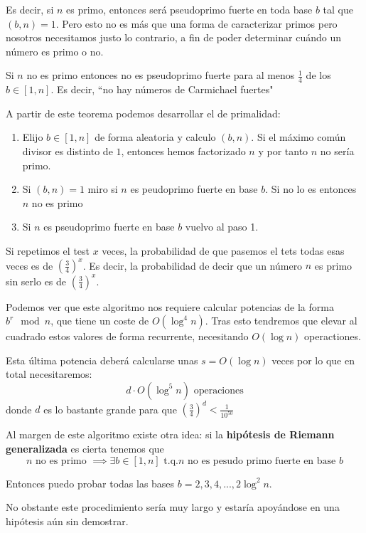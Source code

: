 Es decir, si $n$ es primo, entonces será pseudoprimo fuerte en toda base $b$ tal que $(b,n)=1$.
Pero esto no es más que una forma de caracterizar primos pero nosotros necesitamos justo lo contrario, a fin de poder determinar cuándo un número es primo o no.

\begin{theorem}
Si $n$ no es primo entonces no es pseudoprimo fuerte para al menos $\frac{1}{4}$ de los $b\in [1,n]$. Es decir, ``no hay números de Carmichael fuertes"
\end{theorem}

A partir de este teorema podemos desarrollar el  de primalidad:
\begin{enumerate}
\item Elijo $b\in[1,n]$ de forma aleatoria y calculo $(b,n)$. Si el máximo común divisor es distinto de $1$, entonces hemos factorizado $n$ y por tanto $n$ no sería primo.
\item Si $(b,n)=1$ miro si $n$ es peudoprimo fuerte en base $b$. Si no lo es entonces $n$ no es primo
\item Si $n$ es pseudoprimo fuerte en base $b$ vuelvo al paso 1.
\end{enumerate}

Si repetimos el test $x$ veces, la probabilidad de que pasemos el tets todas esas veces es de $\left(\frac{3}{4}\right)^x$. Es decir, la probabilidad de decir que un número $n$ es primo sin serlo es de $\left(\frac{3}{4}\right)^x$.

Podemos ver que este algoritmo nos requiere calcular potencias de la forma $b^r \mod n$, que tiene un coste de $O(\log^4n)$. Tras esto tendremos que elevar al cuadrado estos valores de forma recurrente, necesitando $O(\log n)$ operactiones.

Esta última potencia deberá calcularse unas $s=O(\log n)$ veces por lo que en total necesitaremos:
\[d\cdot O(\log^5 n)\text{ operaciones}\]
donde $d$ es lo bastante grande para que $\left(\frac{3}{4}\right)^d < \frac{1}{10^{50}}$

Al margen de este algoritmo existe otra idea: si la \textbf{hipótesis de Riemann generalizada} es cierta tenemos que
\[n \text{ no es primo } \implies \exists b \in [1,n] \text{ t.q.} n \text{ no es pesudo primo fuerte en base } b\]

Entonces puedo probar todas las bases $b=2,3,4,...,2\log^2 n$.

No obstante este procedimiento sería muy largo y estaría apoyándose en una hipótesis aún sin demostrar.

